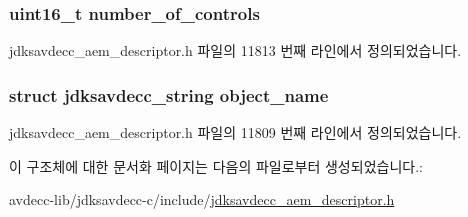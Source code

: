 \subsubsection[{\texorpdfstring{number\+\_\+of\+\_\+controls}{number_of_controls}}]{\setlength{\rightskip}{0pt plus 5cm}uint16\+\_\+t number\+\_\+of\+\_\+controls}\hypertarget{structjdksavdecc__descriptor__jack_a0104bea638bdadf1a547c2b93813e22f}{}\label{structjdksavdecc__descriptor__jack_a0104bea638bdadf1a547c2b93813e22f}


jdksavdecc\+\_\+aem\+\_\+descriptor.\+h 파일의 11813 번째 라인에서 정의되었습니다.

\subsubsection[{\texorpdfstring{object\+\_\+name}{object_name}}]{\setlength{\rightskip}{0pt plus 5cm}struct {\bf jdksavdecc\+\_\+string} object\+\_\+name}\hypertarget{structjdksavdecc__descriptor__jack_a7d1f5945a13863b1762fc6db74fa8f80}{}\label{structjdksavdecc__descriptor__jack_a7d1f5945a13863b1762fc6db74fa8f80}


jdksavdecc\+\_\+aem\+\_\+descriptor.\+h 파일의 11809 번째 라인에서 정의되었습니다.



이 구조체에 대한 문서화 페이지는 다음의 파일로부터 생성되었습니다.\+:\begin{DoxyCompactItemize}
\item 
avdecc-\/lib/jdksavdecc-\/c/include/\hyperlink{jdksavdecc__aem__descriptor_8h}{jdksavdecc\+\_\+aem\+\_\+descriptor.\+h}\end{DoxyCompactItemize}

